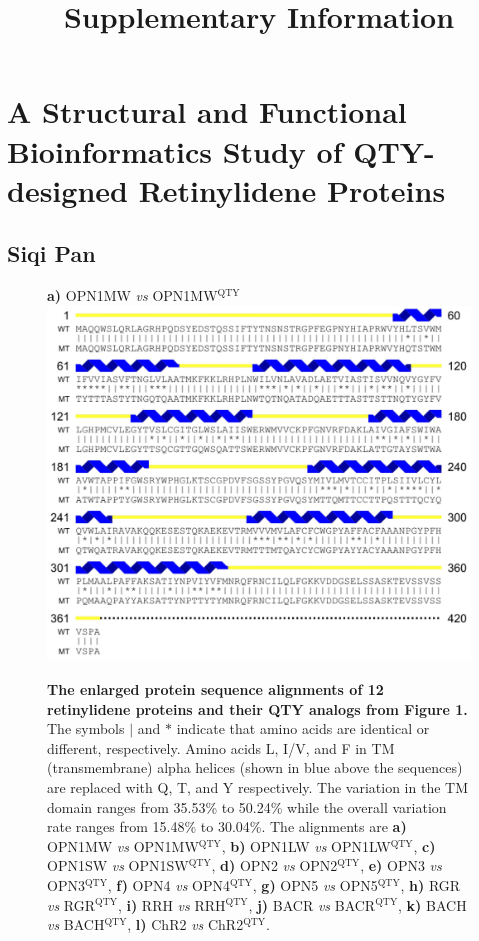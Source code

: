 \documentclass[fleqn,12pt]{supp}
\title{Supplementary Information}
\author{}
\begin{document}
\flushbottom
\maketitle

\vspace{-35pt}
\section*{A Structural and Functional Bioinformatics Study of QTY-designed Retinylidene Proteins}

\subsection*{Siqi Pan}

 

\begin{figure}[H]
    \caption{\textbf{The enlarged protein sequence alignments of 12 retinylidene proteins and their QTY analogs from Figure 1. } The symbols $|$ and $*$ indicate that amino acids are identical or different, respectively. Amino acids L, I/V, and F in TM (transmembrane) alpha helices (shown in blue above the sequences) are replaced with Q, T, and Y respectively. The variation in the TM domain ranges from 35.53\% to 50.24\% while the overall variation rate ranges from 15.48\% to 30.04\%. 
    The alignments are 
    \textbf{a)} OPN1MW \textit{vs} OPN1MW$^{\textrm{QTY}}$, 
    \textbf{b)} OPN1LW \textit{vs} OPN1LW$^{\textrm{QTY}}$, 
    \textbf{c)} OPN1SW \textit{vs} OPN1SW$^{\textrm{QTY}}$, 
    \textbf{d)} OPN2 \textit{vs} OPN2$^{\textrm{QTY}}$, 
    \textbf{e)} OPN3 \textit{vs} OPN3$^{\textrm{QTY}}$, 
    \textbf{f)} OPN4 \textit{vs} OPN4$^{\textrm{QTY}}$, 
    \textbf{g)} OPN5 \textit{vs} OPN5$^{\textrm{QTY}}$, 
    \textbf{h)} RGR \textit{vs} RGR$^{\textrm{QTY}}$, 
    \textbf{i)} RRH \textit{vs} RRH$^{\textrm{QTY}}$, 
    \textbf{j)} BACR \textit{vs} BACR$^{\textrm{QTY}}$, 
    \textbf{k)} BACH \textit{vs} BACH$^{\textrm{QTY}}$, 
    \textbf{l)} ChR2 \textit{vs} ChR2$^{\textrm{QTY}}$. }
    \textbf{a)} OPN1MW \textit{vs} OPN1MW$^{\textrm{QTY}}$ \\
    \includegraphics[width=\linewidth]{FigureS1a.jpg}
\end{figure}
\end{document}
